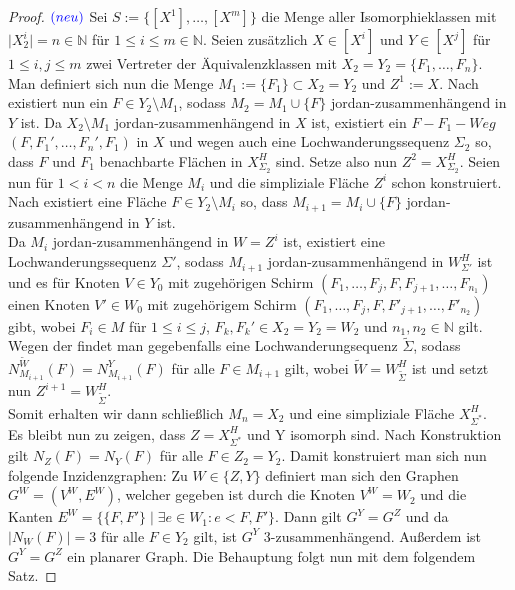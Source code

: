 \documentclass[12pt,titlepage]{article}
\begin{document}
\begin{proof}$\textcolor{blue}{(neu)}$
Sei $S:=\{[X^1],\ldots,[X^m]\}$ die Menge aller Isomorphieklassen mit $\vert X^i_2 \vert =n \in \mathbb{N}$ für 
$1 \leq i \leq m \in \mathbb{N}$. Seien zusätzlich $X \in [X^i]$ und $Y \in [X^j]$ für $1 \leq i,j \leq m$ zwei Vertreter der Äquivalenzklassen mit $X_2=Y_2=\{F_1,\ldots,F_n\}$.
 Man definiert sich nun die Menge $M_1:=\{F_1\} \subset X_2=Y_2$ und $Z^1:=X$. Nach  existiert nun ein $F \in Y_2\setminus M_1$, sodass $M_2=M_1 \cup \{F\}$ jordan-zusammenhängend in $Y$ ist. Da $X_2 \setminus M_1$ jordan-zusammenhängend in $X$ ist, existiert ein $F-F_1-Weg$ $(F,F_1',\ldots,F_n',F_1)$ in $X$ und wegen  auch eine Lochwanderungssequenz $\Sigma_2$ so, dass $F$ und $F_1$ benachbarte Flächen in $X^H_{\Sigma_2} $ sind. Setze also nun $Z^2=X^H_{\Sigma_2}$. Seien nun für $1 < i < n$ die Menge $M_i$ und die simpliziale Fläche $Z^i$ schon konstruiert. Nach   existiert eine Fläche $F \in Y_2 \setminus M_i$ so, dass $M_{i+1}=M_i \cup \{F\}$ jordan-zusammenhängend in $Y$ ist. \\
  Da $M_i$ jordan-zusammenhängend in $W={Z^i}$ ist, existiert eine Lochwanderungssequenz $\Sigma'$, sodass $M_{i+1}$ jordan-zusammenhängend in $W^H_{\Sigma'}$ ist und es für Knoten $V\in Y_0$ mit zugehörigen Schirm $(F_1,\ldots,F_j,F,F_{j+1},\ldots,F_{n_1})$ einen Knoten $V'\in W_0$ mit zugehörigem Schirm $(F_1,\ldots,F_j,F,F'_{j+1},\ldots,F'_{n_2})$ gibt, wobei $F_i \in M$ für $1\leq i\leq j$, $F_k,F_k'\in X_2=Y_2=W_2$ und $n_1,n_2 \in \mathbb{N}$ gilt. Wegen der  findet man gegebenfalls eine Lochwanderungsequenz $\tilde{\Sigma}$, sodass $N_{M_{i+1}}^{\tilde{W}}(F)=N_{M_{i+1}}^Y(F)$ für alle $F \in M_{i+1}$ gilt, wobei $\tilde{W}=W^H_{\tilde{\Sigma}}$ ist  und setzt nun $Z^{i+1}=W^H_{\tilde{\Sigma}}$.\\
Somit erhalten wir dann schließlich $M_n=X_2$ und eine simpliziale Fläche $X^H_{\Sigma^*}$.\\ Es bleibt nun zu zeigen, dass $Z=X^H_{\Sigma^*}$ und Y isomorph sind. Nach Konstruktion gilt $N_Z(F)=N_Y(F)$ für alle $F\in Z_2=Y_2$. Damit konstruiert man sich nun folgende Inzidenzgraphen: 
Zu $W\in \{Z,Y\}$ definiert man sich den Graphen  $G^W=(V^W,E^W)$, welcher gegeben ist durch die Knoten $V^W=W_2$ und die Kanten $E^W=\{\{F,F'\} \mid \exists e \in W_1 : e<F,F' \}$. 
Dann gilt $G^Y=G^Z$ und da $\vert N_W(F) \vert =3$ für alle $F\in Y_2$ gilt,  ist $G^Y$ 3-zusammenhängend. Außerdem ist $G^Y=G^Z$ ein planarer Graph. Die Behauptung folgt nun mit dem folgendem Satz.

\end{proof}
\end{document}
